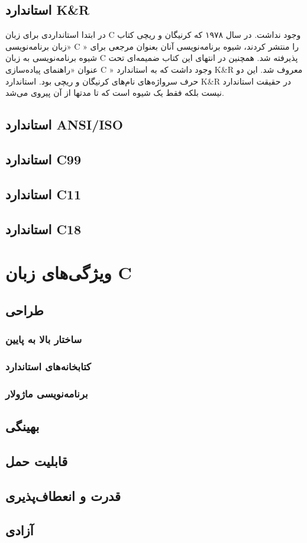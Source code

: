 \subsection{استاندارد K\&R}
در ابتدا استانداردی برای زبان C وجود نداشت. در سال ۱۹۷۸ که کرنیگان و ریچی کتاب «زبان برنامه‌نویسی C » را منتشر کردند، شیوه برنامه‌نویسی آنان بعنوان مرجعی برای شیوه برنامه‌نویسی به زبان C پذیرفته شد. همچنین در انتهای این کتاب ضمیمه‌ای تحت عنوان «راهنمای پیاده‌سازی C » وجود داشت که به استاندارد K\&R معروف شد. این دو حرف سرواژه‌های نام‌های کرنیگان و ریچی بود. استاندارد K\&R در حقیقت استاندارد نیست بلکه فقط یک شیوه است که تا مدتها از آن پیروی می‌شد.
\subsection{استاندارد ANSI/ISO}
\subsection{استاندارد C99}
\subsection{استاندارد C11}
\subsection{استاندارد C18}
\section{ویژگی‌های زبان C}
\subsection{طراحی}
\subsubsection{ساختار بالا به پایین}
\subsubsection{کتابخانه‌های استاندارد}
\subsubsection{برنامه‌نویسی ماژولار}
\subsection{بهینگی}
\subsection{قابلیت حمل}
\subsection{قدرت و انعطاف‌پذیری}
\subsection{آزادی}

